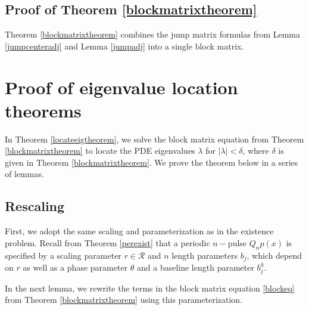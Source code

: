 \documentclass[thesis.tex]{subfiles}
\begin{document}
\subsection{Proof of Theorem \ref{blockmatrixtheorem}}

Theorem \ref{blockmatrixtheorem} combines the jump matrix formulas from Lemma \ref{jumpcenteradj} and Lemma \ref{jumpadj} into a single block matrix. 

\section{Proof of eigenvalue location theorems}

In Theorem \ref{locateeigtheorem}, we solve the block matrix equation from Theorem \ref{blockmatrixtheorem} to locate the PDE eigenvalues $\lambda$ for $|\lambda| < \delta$, where $\delta$ is given in Theorem \ref{blockmatrixtheorem}. We prove the theorem below in a series of lemmas. 

\subsection{Rescaling}

First, we adopt the same scaling and parameterization as in the existence problem. Recall from Theorem \ref{perexist} that a periodic $n-$pulse $Q_np(x)$ is specified by a scaling parameter $r \in \mathcal{R}$ and $n$ length parameters $b_j$, which depend on $r$ as well as a phase parameter $\theta$ and a baseline length parameter $b_j^0$.

In the next lemma, we rewrite the terms in the block matrix equation \eqref{blockeq} from Theorem \ref{blockmatrixtheorem} using this parameterization.
\end{document}
